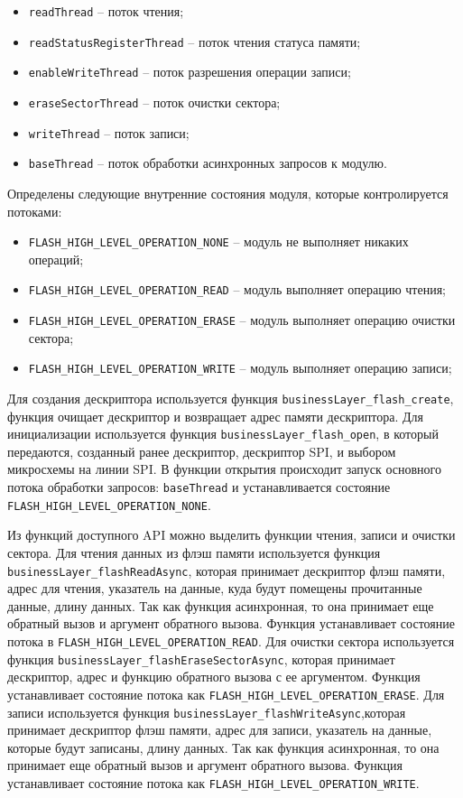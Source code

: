 \begin{itemize}
    \item \lstinline{readThread} -- поток чтения;
    \item \lstinline{readStatusRegisterThread} -- поток чтения статуса памяти;
    \item \lstinline{enableWriteThread} -- поток разрешения операции записи;
    \item \lstinline{eraseSectorThread} -- поток очистки сектора;
    \item \lstinline{writeThread} -- поток записи;
    \item \lstinline{baseThread} -- поток обработки асинхронных запросов к модулю. 
\end{itemize}

Определены следующие внутренние состояния модуля, которые контролируется потоками:

\begin{itemize}
    \item \lstinline{FLASH_HIGH_LEVEL_OPERATION_NONE} -- модуль не выполняет никаких операций;
    \item \lstinline{FLASH_HIGH_LEVEL_OPERATION_READ} -- модуль выполняет операцию чтения;
    \item \lstinline{FLASH_HIGH_LEVEL_OPERATION_ERASE} -- модуль выполняет операцию очистки сектора;
    \item \lstinline{FLASH_HIGH_LEVEL_OPERATION_WRITE} -- модуль выполняет операцию записи;
\end{itemize}

Для создания дескриптора используется функция \lstinline{businessLayer_flash_create},
функция очищает дескриптор и возвращает адрес памяти дескриптора. Для инициализации используется функция \lstinline{businessLayer_flash_open},
в который передаются, созданный ранее дескриптор, дескриптор SPI, и выбором микросхемы на линии SPI. В функции открытия происходит запуск основного потока
обработки запросов: \lstinline{baseThread} и устанавливается состояние \lstinline{FLASH_HIGH_LEVEL_OPERATION_NONE}.

Из функций доступного API можно выделить функции чтения, записи и очистки сектора.
Для чтения данных из флэш памяти используется функция \lstinline{businessLayer_flashReadAsync}, которая принимает дескриптор флэш памяти, адрес для чтения, указатель на данные,
куда будут помещены прочитанные данные, длину данных.
Так как функция асинхронная, то она принимает еще обратный вызов и аргумент обратного вызова. Функция устанавливает состояние потока в \lstinline{FLASH_HIGH_LEVEL_OPERATION_READ}.
Для очистки сектора используется функция \lstinline|businessLayer_flashEraseSectorAsync|, которая принимает дескриптор, адрес и функцию обратного вызова с ее аргументом. Функция
устанавливает состояние потока как \lstinline{FLASH_HIGH_LEVEL_OPERATION_ERASE}.
Для записи используется функция \lstinline|businessLayer_flashWriteAsync|,которая принимает дескриптор флэш памяти, адрес для записи, указатель на данные, которые будут записаны,
длину данных. Так как функция асинхронная, то она принимает еще обратный вызов и аргумент обратного вызова. Функция устанавливает состояние потока как  \lstinline{FLASH_HIGH_LEVEL_OPERATION_WRITE}.

